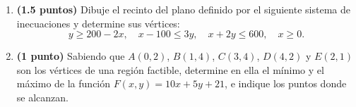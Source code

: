 
\begin{enumerate}[label=\alph*)]
\item \textbf{(1.5 puntos)} Dibuje el recinto del plano definido por el siguiente sistema de inecuaciones y determine sus vértices:
\[
y\geq200-2x,\quad x-100\leq3y,\quad x+2y\leq600,\quad x\geq0.
\]
\item \textbf{(1 punto)} Sabiendo que $A(0,2)$, $B(1,4)$, $C(3,4)$, $D(4,2)$ y $E(2,1)$ son los vértices de una región factible, determine en ella el mínimo y el máximo de la función $F(x,y)=10x+5y+21$, e indique los puntos donde se alcanzan.
\end{enumerate}
